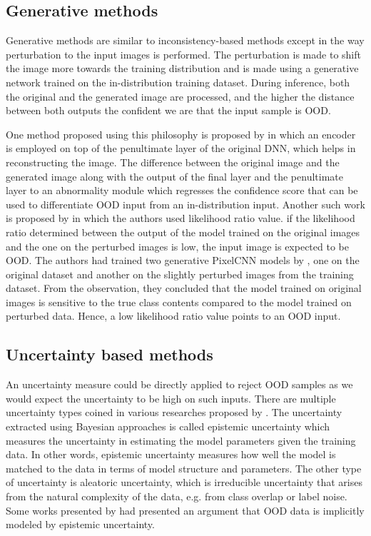     \subsection{Generative methods}
    Generative methods are similar to inconsistency-based methods except in the way perturbation to the input images is performed. The perturbation is made to shift the image more towards the training distribution and is made using a generative network trained on the in-distribution training dataset. During inference, both the original and the generated image are processed, and the higher the distance between both outputs the confident we are that the input sample is OOD.
    
    One method proposed using this philosophy is proposed by \citet{Hendrycks2017} in which an encoder is employed on top of the penultimate layer of the original DNN, which helps in reconstructing the image. The difference between the original image and the generated image along with the output of the final layer and the penultimate layer to an abnormality module which regresses the confidence score that can be used to differentiate OOD input from an in-distribution input. Another such work is proposed by \citet{Ren2019} in which the authors used likelihood ratio value. if the likelihood ratio determined between the output of the model trained on the original images and the one on the perturbed images is low, the input image is expected to be OOD. The authors had trained two generative PixelCNN models by \citet{VanDenOord2016}, one on the original dataset and another on the slightly perturbed images from the training dataset. From the observation, they concluded that the model trained on original images is sensitive to the true class contents compared to the model trained on perturbed data. Hence, a low likelihood ratio value points to an OOD input.  
    
    \subsection{Uncertainty based methods}
    An uncertainty measure could be directly applied to reject OOD samples as we would expect the uncertainty to be high on such inputs. There are multiple uncertainty types coined in various researches proposed by \citet{MacKay1992, MacKayThesis1992, Radford1996}. The uncertainty extracted using Bayesian approaches is called epistemic uncertainty which measures the uncertainty in estimating the model parameters given the training data. In other words, epistemic uncertainty measures how well the model is matched to the data in terms of model structure and parameters. The other type of uncertainty is aleatoric uncertainty, which is irreducible uncertainty that arises from the natural complexity of the data, e.g. from class overlap or label noise. Some works presented by \citet{JimThesis1992, Lakshminarayanan2017, VanAmersfoort2020} had presented an argument that OOD data is implicitly modeled by epistemic uncertainty.
    
